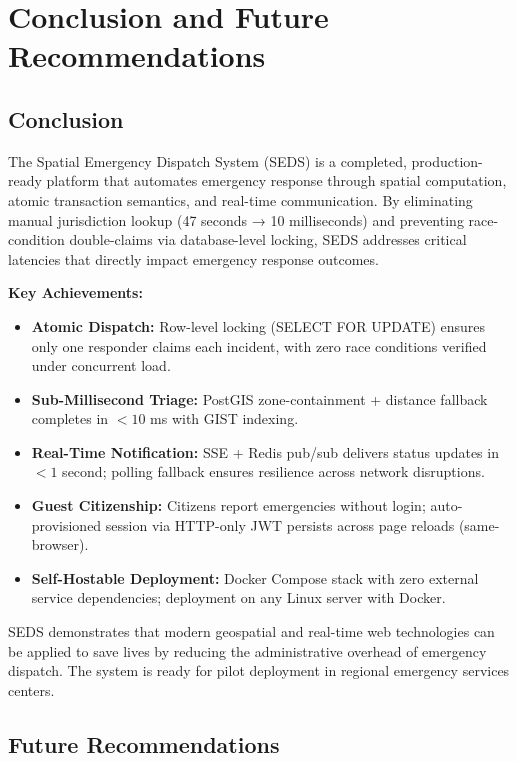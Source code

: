 \chapter{Conclusion and Future Recommendations}

\section{Conclusion}

The Spatial Emergency Dispatch System (SEDS) is a completed, production-ready platform that automates emergency response through spatial computation, atomic transaction semantics, and real-time communication. By eliminating manual jurisdiction lookup (47 seconds → 10 milliseconds) and preventing race-condition double-claims via database-level locking, SEDS addresses critical latencies that directly impact emergency response outcomes.

\textbf{Key Achievements:}

\begin{itemize}
  \item \textbf{Atomic Dispatch:} Row-level locking (SELECT FOR UPDATE) ensures only one responder claims each incident, with zero race conditions verified under concurrent load.
  \item \textbf{Sub-Millisecond Triage:} PostGIS zone-containment + distance fallback completes in $< 10$ ms with GIST indexing.
  \item \textbf{Real-Time Notification:} SSE + Redis pub/sub delivers status updates in $< 1$ second; polling fallback ensures resilience across network disruptions.
  \item \textbf{Guest Citizenship:} Citizens report emergencies without login; auto-provisioned session via HTTP-only JWT persists across page reloads (same-browser).
  \item \textbf{Self-Hostable Deployment:} Docker Compose stack with zero external service dependencies; deployment on any Linux server with Docker.
\end{itemize}

SEDS demonstrates that modern geospatial and real-time web technologies can be applied to save lives by reducing the administrative overhead of emergency dispatch. The system is ready for pilot deployment in regional emergency services centers.

\section{Future Recommendations}

